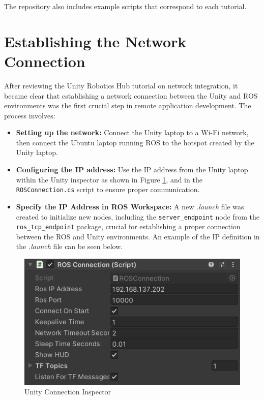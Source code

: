     The repository also includes example scripts that correspond to each tutorial.
    
    \section{Establishing the Network Connection}
    After reviewing the Unity Robotics Hub tutorial on network integration, it became clear that establishing a network connection between the Unity and ROS environments was the first crucial step in remote application development. The process involves:
    \begin{itemize}
        \item \textbf{Setting up the network:} Connect the Unity laptop to a Wi-Fi network, then connect the Ubuntu laptop running ROS to the hotspot created by the Unity laptop.
        \item \textbf{Configuring the IP address:} Use the IP address from the Unity laptop within the Unity inspector as shown in Figure \ref{fig:unity_connection}, and in the \texttt{ROSConnection.cs} script to ensure proper communication.
        \item \textbf{Specify the IP Address in ROS Workspace:} A new \textit{.launch} file was created to initialize new nodes, including the \texttt{server\_endpoint} node from the \texttt{ros\_tcp\_endpoint} package, crucial for establishing a proper connection between the ROS and Unity environments. An example of the IP definition in the \textit{.launch} file can be seen below.
    \end{itemize}
    
    \begin{figure}[htbp]
        \centering
        \includegraphics[width=0.5\linewidth]{figs/connection_inspector.png}
        \caption{Unity Connection Inspector}
        \label{fig:unity_connection}
    \end{figure}
    
